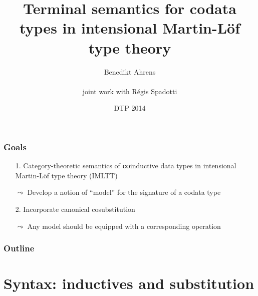 \documentclass[
]
{beamer}
\title[Terminal semantics for codata in IMLTT]{Terminal semantics for codata types in intensional Martin-Löf type theory}
\author[B.\ Ahrens and R.\ Spadotti]{Benedikt Ahrens \\~\\ joint work with R\'egis Spadotti}
\date[2014-07-13]{DTP 2014}
\institute[IRIT] %
{%
  Institut de Recherche en Informatique de Toulouse\\
   Universit\'e Paul Sabatier\\ ~ \\
}
\newcommand{\fat}[1]{\textbf{#1}}
\begin{document}
\begin{frame}
 \titlepage
\end{frame}


\begin{frame}
 \frametitle{Goals}
 
   \begin{itemize}\setlength{\itemsep}{1em}
    \item [1.]Category-theoretic semantics of \fat{co}inductive data types
          in intensional Martin-L\"of type theory (IMLTT)
    \item [$\leadsto$] Develop a notion of \enquote{model} for the signature of a codata type
    \item [2.] Incorporate canonical cosubstitution
    \item [$\leadsto$] Any model should be equipped with a corresponding operation
   \end{itemize}


 
\end{frame}


\begin{frame}
 \frametitle{Outline}
 \tableofcontents
\end{frame}


\section{Syntax: inductives and substitution}

\begin{comment}
\begin{frame}
 \frametitle{Starting point: W-types in Martin-L\"of TT}
 
  
 \begin{block}{Well-founded trees as \fat{initial algebra} of polynomial functor}
 
  \begin{itemize}
   \item Trees specified by $A$ and $x:A\vdash B(x)$
   
   \item Type of natural numbers $\mathbb{N} := W~A~B$ with: \[A = \{O,S\}, \quad B(O) = \{\}, \quad B(S)=\{*\}\]
 
   \item The type $W~A~B$ is the (carrier of) the initial algebra of
    \[X \mapsto \sum_{a:A}X^{B(a)} \]
 
 
   
   \item Dybjer '97, Moerdijk and Palmgren '00
  \end{itemize}
 \end{block}
\end{frame}
\end{comment}
\end{document}
